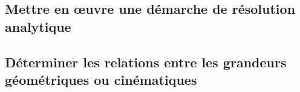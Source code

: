 
\proffalse
\begin{multicols}{2}
\section{Mettre en œuvre une démarche de résolution analytique}
\subsection{Déterminer les relations entre les grandeurs géométriques ou cinématiques}


\renewcommand{\repExo}{../../ExercicesCompetences/C2_MettreEnOeuvreDemarche/C2_06_DeterminerLoisES}

\renewcommand{\td}{10_PompePalette}
\graphicspath{{\repStyle/png/}{\repExo/\td/images/}}


\renewcommand{\td}{11_PompePistonsRadiaux}
\graphicspath{{\repStyle/png/}{\repExo/\td/images/}}


\renewcommand{\td}{12_BielleManivelle}
\graphicspath{{\repStyle/png/}{\repExo/\td/images/}}


\renewcommand{\td}{13_TransfoMouvement}
\graphicspath{{\repStyle/png/}{\repExo/\td/images/}}


\renewcommand{\td}{14_Sympact}
\graphicspath{{\repStyle/png/}{\repExo/\td/images/}}


\renewcommand{\td}{15_SympactGalet}
\graphicspath{{\repStyle/png/}{\repExo/\td/images/}}


\renewcommand{\td}{16_Poussoir}
\graphicspath{{\repStyle/png/}{\repExo/\td/images/}}


\renewcommand{\td}{17_4Barres}
\graphicspath{{\repStyle/png/}{\repExo/\td/images/}}


\renewcommand{\td}{18_Maxpid}
\graphicspath{{\repStyle/png/}{\repExo/\td/images/}}


\renewcommand{\td}{19_Graham}
\graphicspath{{\repStyle/png/}{\repExo/\td/images/}}


\renewcommand{\td}{20_VariateurBilles}
\graphicspath{{\repStyle/png/}{\repExo/\td/images/}}


\end{multicols}
%
%

%
\newpage
